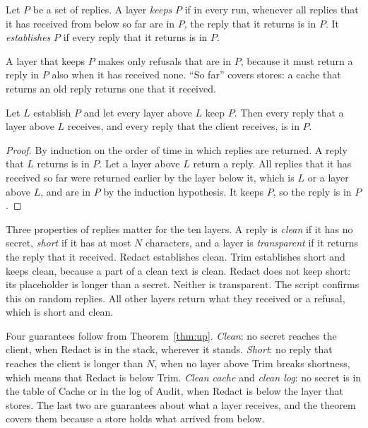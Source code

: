 \documentclass[acmsmall,nonacm,screen]{acmart}
\newcommand{\ly}[1]{\textsf{#1}}
\newcommand{\claim}[2]{#2}
\begin{document}
\begin{definition}
\label{def:keep}
Let $P$ be a set of replies. A layer \emph{keeps} $P$ if in every run, whenever all replies
that it has received from below so far are in $P$, the reply that it returns is in $P$. It
\emph{establishes} $P$ if every reply that it returns is in $P$.
\end{definition}

A layer that keeps $P$ makes only refusals that are in $P$, because it must return a reply
in $P$ also when it has received none. ``So far'' covers stores: a cache that returns an old
reply returns one that it received.

\begin{theorem}
\label{thm:up}
Let $L$ establish $P$ and let every layer above $L$ keep $P$. Then every reply that a layer
above $L$ receives, and every reply that the client receives, is in $P$.
\end{theorem}

\begin{proof}
By induction on the order of time in which replies are returned. A reply that $L$ returns is
in $P$. Let a layer above $L$ return a reply. All replies that it has received so far were
returned earlier by the layer below it, which is $L$ or a layer above $L$, and are in $P$ by
the induction hypothesis. It keeps $P$, so the reply is in $P$.
\end{proof}

Three properties of replies matter for the ten layers. A reply is \emph{clean} if it has no
secret, \emph{short} if it has at most $N$ characters, and a layer is \emph{transparent} if
it returns the reply that it received. \ly{Redact} establishes clean. \ly{Trim} establishes
short and keeps clean, because a part of a clean text is clean. \ly{Redact} does not keep
short: its placeholder is longer than a secret. Neither is transparent.
\claim{replies}{The script confirms this on \exReplyTrials{} random replies.} All other
layers return what they received or a refusal, which is short and clean.

Four guarantees follow from Theorem~\ref{thm:up}. \emph{Clean}: no secret reaches the
client, when \ly{Redact} is in the stack, wherever it stands. \emph{Short}: no reply that
reaches the client is longer than $N$, when no layer above \ly{Trim} breaks shortness, which
means that \ly{Redact} is below \ly{Trim}. \emph{Clean cache} and \emph{clean log}: no secret
is in the table of \ly{Cache} or in the log of \ly{Audit}, when \ly{Redact} is below the
layer that stores. The last two are guarantees about what a layer receives, and the theorem
covers them because a store holds what arrived from below.
\end{document}
